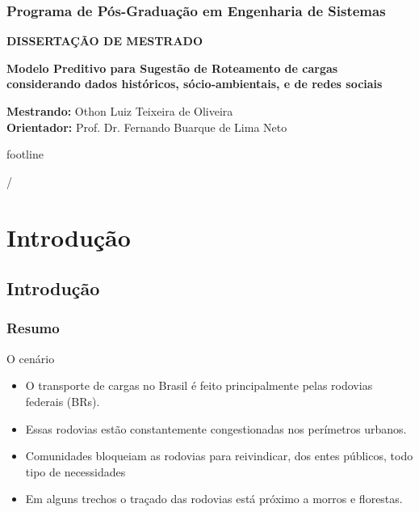 \documentclass[11pt]{beamer}
\begin{document}
\begin{frame}
	\frametitle{ \Large Programa de Pós-Graduação em Engenharia de Sistemas}
	\begin{center}
		\Large \textbf{DISSERTAÇÃO DE MESTRADO} 
	\end{center}
	\pause
	\begin{block}
		\Large \textbf{Modelo Preditivo para Sugestão de Roteamento de cargas considerando dados históricos, sócio-ambientais, e de redes sociais}
	\end{block}
	
	\pause
	\vspace{0.3in}
	\textbf{Mestrando:} Othon Luiz Teixeira de Oliveira \\
	\textbf{Orientador:} Prof. Dr. Fernando Buarque de Lima Neto
	
\end{frame}



\addtocounter{framenumber}{-1}
\setbeamertemplate
 {footline}{\quad\hfill\insertframenumber/\inserttotalframenumber\strut\quad} 

\section{ Introdução}
\subsection{Introdução}


\begin{frame}\frametitle{Resumo}	
	\begin{block}{O cenário}
		\begin{itemize}
			\item O transporte de cargas no Brasil é feito principalmente pelas rodovias federais (BRs). 
			\pause
			\item Essas rodovias estão constantemente congestionadas nos perímetros urbanos.
			\pause
			\item Comunidades bloqueiam as rodovias para reivindicar, dos entes públicos, todo tipo de necessidades
			\pause
			\item Em alguns trechos o traçado das rodovias está próximo a morros e florestas.
		\end{itemize}
	\end{block}
\end{frame}
\end{document}
